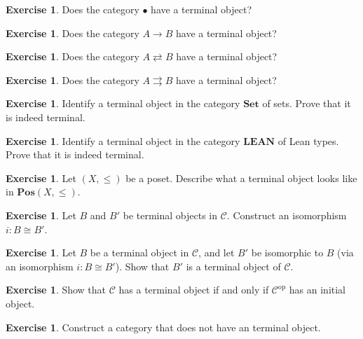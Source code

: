 \documentclass[a4paper,10pt]{scrartcl}
\theoremstyle{plain}
\theoremstyle{definition}
\newtheorem{exer}[thm]{Exercise}
\newcommand{\Cat}[1]{\mathcal{#1}}
\newcommand{\CC}{\Cat{C}}
\newcommand{\Catb}[1]{\mathbf{#1}}
\newcommand{\SET}{\Catb{Set}}
\newcommand{\POS}{\Catb{Pos}}
\newcommand{\LEAN}{\Catb{LEAN}}
\newcommand{\op}[1]{\ensuremath{{#1}^\text{op}}}
\begin{document}
\begin{exer}
  Does the category $\bullet$ have a terminal object?
\end{exer}

\begin{exer}
  Does the category $A \to B$ have a terminal object?
\end{exer}

\begin{exer}
  Does the category $A \rightleftarrows B$ have a terminal object?
\end{exer}

\begin{exer}
  Does the category $A \rightrightarrows B$ have a terminal object?
\end{exer}



\begin{exer}
  Identify a terminal object in the category $\SET$ of sets.
  Prove that it is indeed terminal.
\end{exer}

\begin{exer}
  Identify a terminal object in the category $\LEAN$ of Lean types.
  Prove that it is indeed terminal.
\end{exer}

\begin{exer}
  Let $(X,\leq)$ be a poset. Describe what a terminal object looks like in  $\POS(X,\leq)$.
\end{exer}

\begin{exer}\label{exer:terminal-unique}
  Let $B$ and $B'$ be terminal objects in $\CC$. Construct an isomorphism $i : B \cong B'$.
\end{exer}

\begin{exer}
  Let $B$ be a terminal object in $\CC$, and let $B'$ be isomorphic to $B$ (via an isomorphism $i : B \cong B'$).
  Show that $B'$ is a terminal object of $\CC$.
\end{exer}

\begin{exer}
  Show that $\CC$ has a terminal object if and only if $\op\CC$ has an initial object.
\end{exer}

\begin{exer}
  Construct a category that does not have an terminal object.
\end{exer}
\end{document}
